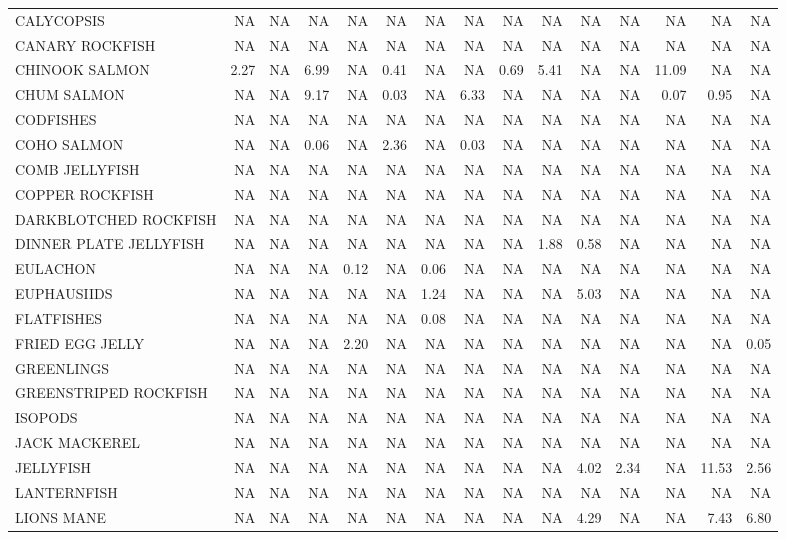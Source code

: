 \documentclass[12pt]{article}\usepackage[]{graphicx}\usepackage[]{color}
\begin{document}
\begin{landscape}
\begin{longtable}[t]{>{\raggedright\arraybackslash}p{3.6 cm}rrrrrrrrrrrrrr}
CALYCOPSIS & NA & NA & NA & NA & NA & NA & NA & NA & NA & NA & NA & NA & NA & NA\\
CANARY ROCKFISH & NA & NA & NA & NA & NA & NA & NA & NA & NA & NA & NA & NA & NA & NA\\
CHINOOK SALMON & 2.27 & NA & 6.99 & NA & 0.41 & NA & NA & 0.69 & 5.41 & NA & NA & 11.09 & NA & NA\\
CHUM SALMON & NA & NA & 9.17 & NA & 0.03 & NA & 6.33 & NA & NA & NA & NA & 0.07 & 0.95 & NA\\
CODFISHES & NA & NA & NA & NA & NA & NA & NA & NA & NA & NA & NA & NA & NA & NA\\
COHO SALMON & NA & NA & 0.06 & NA & 2.36 & NA & 0.03 & NA & NA & NA & NA & NA & NA & NA\\
COMB JELLYFISH & NA & NA & NA & NA & NA & NA & NA & NA & NA & NA & NA & NA & NA & NA\\
COPPER ROCKFISH & NA & NA & NA & NA & NA & NA & NA & NA & NA & NA & NA & NA & NA & NA\\
DARKBLOTCHED ROCKFISH & NA & NA & NA & NA & NA & NA & NA & NA & NA & NA & NA & NA & NA & NA\\
DINNER PLATE JELLYFISH & NA & NA & NA & NA & NA & NA & NA & NA & 1.88 & 0.58 & NA & NA & NA & NA\\
EULACHON & NA & NA & NA & 0.12 & NA & 0.06 & NA & NA & NA & NA & NA & NA & NA & NA\\
EUPHAUSIIDS & NA & NA & NA & NA & NA & 1.24 & NA & NA & NA & 5.03 & NA & NA & NA & NA\\
FLATFISHES & NA & NA & NA & NA & NA & 0.08 & NA & NA & NA & NA & NA & NA & NA & NA\\
FRIED EGG JELLY & NA & NA & NA & 2.20 & NA & NA & NA & NA & NA & NA & NA & NA & NA & 0.05\\
GREENLINGS & NA & NA & NA & NA & NA & NA & NA & NA & NA & NA & NA & NA & NA & NA\\
GREENSTRIPED ROCKFISH & NA & NA & NA & NA & NA & NA & NA & NA & NA & NA & NA & NA & NA & NA\\
ISOPODS & NA & NA & NA & NA & NA & NA & NA & NA & NA & NA & NA & NA & NA & NA\\
JACK MACKEREL & NA & NA & NA & NA & NA & NA & NA & NA & NA & NA & NA & NA & NA & NA\\
JELLYFISH & NA & NA & NA & NA & NA & NA & NA & NA & NA & 4.02 & 2.34 & NA & 11.53 & 2.56\\
LANTERNFISH & NA & NA & NA & NA & NA & NA & NA & NA & NA & NA & NA & NA & NA & NA\\
LIONS MANE & NA & NA & NA & NA & NA & NA & NA & NA & NA & 4.29 & NA & NA & 7.43 & 6.80\\

\end{longtable}
\end{landscape}
\end{document}
